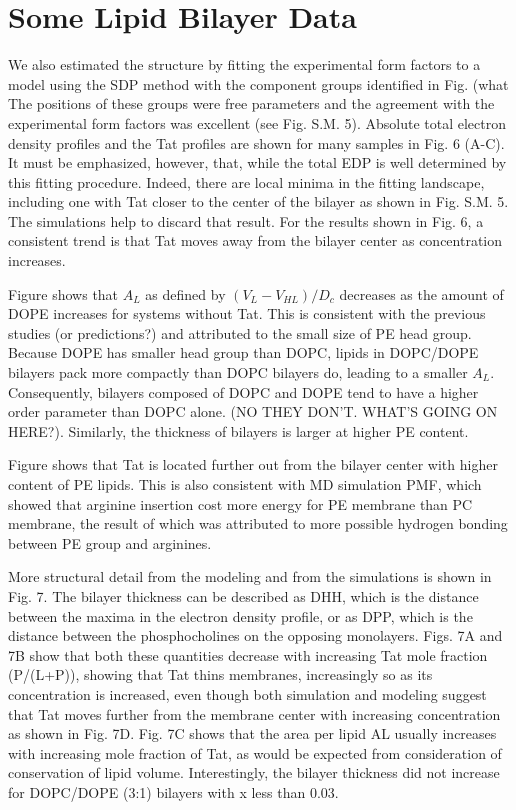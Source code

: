 \documentclass[12pt,letterpaper]{article}
\begin{document}
\section{Some Lipid Bilayer Data}
We also estimated the structure by fitting the experimental form factors to a 
model using the SDP method with the component groups identified in Fig. (what  
The positions of 
these groups were free parameters and the agreement with the experimental form 
factors was excellent (see Fig. S.M. 5).  Absolute total electron density 
profiles and the Tat profiles are shown for many samples in Fig. 6 (A-C).  
It must be emphasized, however, that, while the total EDP is well determined by 
this fitting procedure.  Indeed, there are local minima in the fitting landscape, 
including one with Tat closer to the center of the bilayer as shown in Fig. 
S.M. 5.  The simulations help to discard that result. For the results shown in 
Fig. 6, a consistent trend is that Tat moves away from the bilayer center as 
concentration increases. 

Figure shows that $A_L$ as defined by $(V_L-V_{HL})/D_c$ decreases as the 
amount of DOPE increases for systems without Tat. This is consistent with the
previous studies (or predictions?) and attributed to the small size of PE
head group. Because DOPE has smaller head group than DOPC, lipids in DOPC/DOPE
bilayers pack more compactly than DOPC bilayers do, leading to a smaller $A_L$.
Consequently, bilayers composed of DOPC and DOPE tend to have a higher order 
parameter than DOPC alone. (NO THEY DON'T. WHAT'S GOING ON HERE?). Similarly,
the thickness of bilayers is larger at higher PE content. 

Figure shows that Tat is located further out from the bilayer center with 
higher content of PE lipids. This is also consistent with MD simulation PMF,
which showed that arginine insertion cost more energy for PE membrane than
PC membrane, the result of which was attributed to more possible hydrogen 
bonding between PE group and arginines.



More structural detail from the modeling and from the simulations is shown in 
Fig. 7. The bilayer thickness can be described as DHH, which is the 
distance between the maxima in the electron density profile, or as DPP, which 
is the distance between the phosphocholines on the opposing monolayers. Figs. 
7A and 7B show that both these quantities decrease with increasing Tat mole 
fraction (P/(L+P)), showing that Tat thins membranes, increasingly so as its 
concentration is increased, even though both simulation and modeling suggest 
that Tat moves further from the membrane center with increasing concentration 
as shown in Fig. 7D.  Fig. 7C shows that the area per lipid AL usually increases 
with increasing mole fraction of Tat, as would be expected from consideration of 
conservation of lipid volume. Interestingly, the bilayer thickness did not 
increase for DOPC/DOPE (3:1) bilayers with x less than 0.03.  
\end{document}
